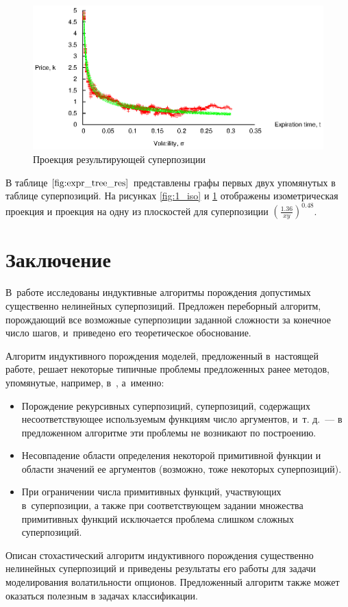 \documentclass[12pt,a4paper]{article}
\begin{document}
\begin{figure}[h]
  \includegraphics[scale=1.1]{figs/1-proj.eps}
  \caption{Проекция результирующей суперпозиции}
  \label{fig:1_proj}
\end{figure}

В таблице $\ref{fig:expr_tree_res}$ представлены графы
первых двух упомянутых в таблице суперпозиций. На рисунках \ref{fig:1_iso} и
\ref{fig:1_proj} отображены изометрическая проекция и проекция на одну из
плоскостей для суперпозиции $\left(\frac{1.36}{xy}\right)^{0.48}$. 

\section{Заключение}

В~работе исследованы индуктивные алгоритмы порождения допустимых существенно
нелинейных суперпозиций. Предложен переборный алгоритм, порождающий все
возможные суперпозиции заданной сложности за конечное число шагов, и~приведено
его теоретическое обоснование. 

Алгоритм индуктивного порождения моделей, предложенный в~настоящей работе,
решает некоторые типичные проблемы предложенных ранее методов, упомянутые,
например, в~\cite{Zelinka2008}, а~именно:
\begin{itemize}
  \item Порождение рекурсивных суперпозиций, суперпозиций, содержащих
	несоответствующее используемым функциям число аргументов, и~т. д.~--- в
	предложенном алгоритме эти проблемы не возникают по построению.
  \item Несовпадение области определения некоторой примитивной функции и области
	значений ее аргументов (возможно, тоже некоторых суперпозиций).
  \item При ограничении числа примитивных функций, участвующих в~суперпозиции,
	а также при соответствующем задании множества примитивных функций
	исключается проблема слишком сложных суперпозиций.
\end{itemize}

Описан стохастический алгоритм индуктивного порождения существенно нелинейных
суперпозиций и приведены результаты его работы для задачи моделирования
волатильности опционов. Предложенный алгоритм также может оказаться полезным
в задачах классификации.

\FloatBarrier


\extrasrussian

\end{document}
